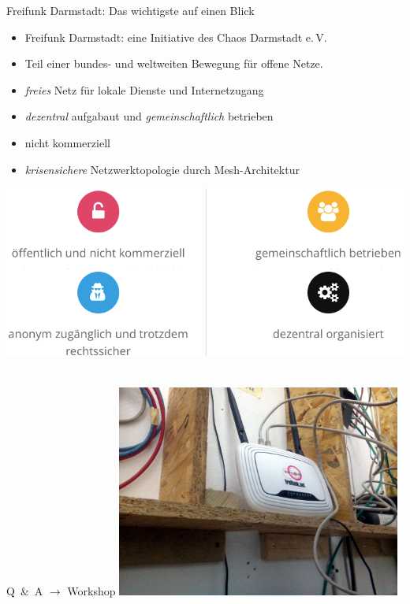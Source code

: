 \documentclass[10pt]{beamer}
\begin{document}
    \begin{frame}{Freifunk Darmstadt: Das wichtigste auf einen Blick}
      \begin{centering}
      \begin{itemize}
        \item Freifunk Darmstadt: eine Initiative des Chaos Darmstadt e.\,V.
        \item Teil einer bundes- und weltweiten Bewegung für offene Netze.
        \item \emph{freies} Netz für lokale Dienste und Internetzugang
        \item \emph{dezentral} aufgabaut und \emph{gemeinschaftlich} betrieben
        \item nicht kommerziell
        \item \emph{krisensichere} Netzwerktopologie durch Mesh-Architektur
      \end{itemize}
      \includegraphics[width=1.0\textheight]{images/principles}$\;$
      \end{centering}
    \end{frame}

    \begin{frame}{Q~\&~A $\rightarrow$ Workshop}
      \vfill
      \centering
      \includegraphics[width=0.7\textwidth]{images/irl_router}
      \vfill
    \end{frame}
\end{document}
